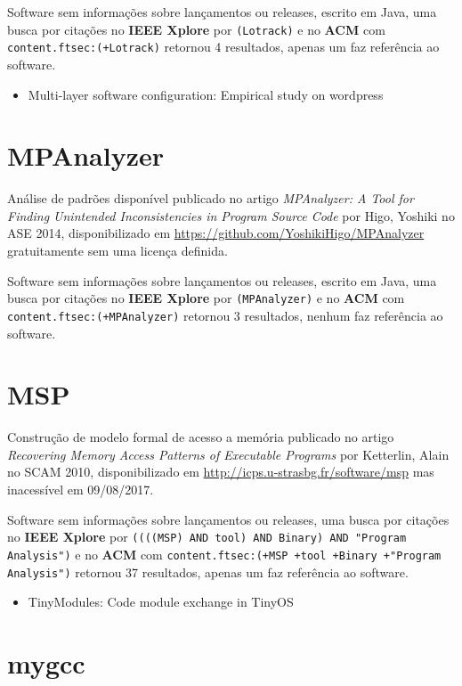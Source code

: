 Software sem informações sobre lançamentos ou releases,
escrito em Java,
uma busca por citações no {\bf IEEE Xplore} por
\texttt{(Lotrack)}
e no {\bf ACM} com
\texttt{content.ftsec:(+Lotrack)}
retornou
4 resultados,
apenas um faz referência ao software.

\begin{itemize}
\item Multi-layer software configuration: Empirical study on wordpress
\end{itemize}


\section{MPAnalyzer}

Análise de padrões disponível
publicado no artigo {\it MPAnalyzer: A Tool for Finding Unintended Inconsistencies in Program Source Code}
por Higo, Yoshiki
no ASE 2014,
disponibilizado em \url{https://github.com/YoshikiHigo/MPAnalyzer}
gratuitamente
sem uma licença definida.

Software sem informações sobre lançamentos ou releases,
escrito em Java,
uma busca por citações no {\bf IEEE Xplore} por
\texttt{(MPAnalyzer)}
e no {\bf ACM} com
\texttt{content.ftsec:(+MPAnalyzer)}
retornou
3 resultados,
nenhum faz referência ao software.



\section{MSP}

Construção de modelo formal de acesso a memória
publicado no artigo {\it Recovering Memory Access Patterns of Executable Programs}
por Ketterlin, Alain
no SCAM 2010,
disponibilizado em \url{http://icps.u-strasbg.fr/software/msp}
mas inacessível em 09/08/2017.

Software sem informações sobre lançamentos ou releases,
uma busca por citações no {\bf IEEE Xplore} por
\texttt{((((MSP) AND tool) AND Binary) AND "Program Analysis")}
e no {\bf ACM} com
\texttt{content.ftsec:(+MSP +tool +Binary +"Program Analysis")}
retornou
37 resultados,
apenas um faz referência ao software.

\begin{itemize}
\item TinyModules: Code module exchange in TinyOS
\end{itemize}


\section{mygcc}

